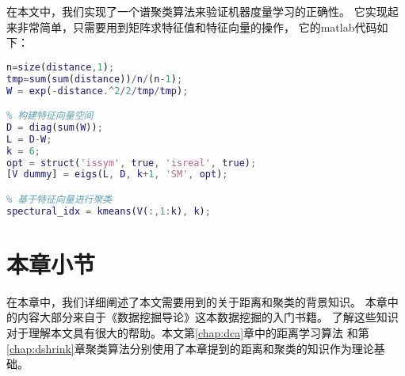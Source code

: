 在本文中，我们实现了一个谱聚类算法来验证机器度量学习的正确性。
它实现起来非常简单，只需要用到矩阵求特征值和特征向量的操作，
它的matlab代码如下：

\begin{lstlisting}[language={matlab}, caption={谱聚类算法的简单实现}]
% 将距离矩阵转换为相似度矩阵
n=size(distance,1);
tmp=sum(sum(distance))/n/(n-1);
W = exp(-distance.^2/2/tmp/tmp);

% 构建特征向量空间
D = diag(sum(W));
L = D-W;
k = 6;
opt = struct('issym', true, 'isreal', true);
[V dummy] = eigs(L, D, k+1, 'SM', opt);

% 基于特征向量进行聚类
spectural_idx = kmeans(V(:,1:k), k);

\end{lstlisting}


\section{本章小节}

在本章中，我们详细阐述了本文需要用到的关于距离和聚类的背景知识。
本章中的内容大部分来自于《数据挖掘导论》这本数据挖掘的入门书籍。
了解这些知识对于理解本文具有很大的帮助。本文第\ref{chap:dca}章中的距离学习算法
和第\ref{chap:dshrink}章聚类算法分别使用了本章提到的距离和聚类的知识作为理论基础。
